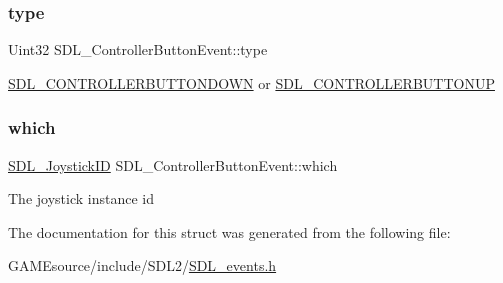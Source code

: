\subsubsection{\texorpdfstring{type}{type}}
{\footnotesize\ttfamily Uint32 S\+D\+L\+\_\+\+Controller\+Button\+Event\+::type}

\mbox{\hyperlink{_s_d_l__events_8h_a3b589e89be6b35c02e0dd34a55f3fccaaafe044d5f92ac9608ded473218569474}{S\+D\+L\+\_\+\+C\+O\+N\+T\+R\+O\+L\+L\+E\+R\+B\+U\+T\+T\+O\+N\+D\+O\+WN}} or \mbox{\hyperlink{_s_d_l__events_8h_a3b589e89be6b35c02e0dd34a55f3fccaa8cb5a10b1ae0e185ef69a321d3d2d1be}{S\+D\+L\+\_\+\+C\+O\+N\+T\+R\+O\+L\+L\+E\+R\+B\+U\+T\+T\+O\+N\+UP}} \mbox{\label{struct_s_d_l___controller_button_event_a98777e88b5d5cae83eef16ffd4bcacc1}} 
\subsubsection{\texorpdfstring{which}{which}}
{\footnotesize\ttfamily \mbox{\hyperlink{_s_d_l__joystick_8h_a3c3d32500cb08f76ee8077983912c0bd}{S\+D\+L\+\_\+\+Joystick\+ID}} S\+D\+L\+\_\+\+Controller\+Button\+Event\+::which}

The joystick instance id 

The documentation for this struct was generated from the following file\+:\begin{DoxyCompactItemize}
\item 
G\+A\+M\+Esource/include/\+S\+D\+L2/\mbox{\hyperlink{_s_d_l__events_8h}{S\+D\+L\+\_\+events.\+h}}\end{DoxyCompactItemize}
